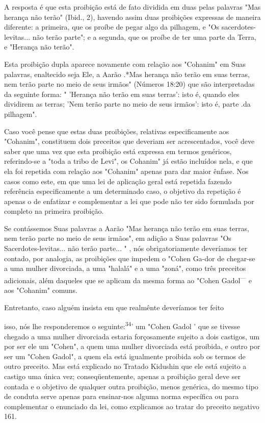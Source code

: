 \begin{itemize}
\begin{enumrate}
\begin{itemize}
\begin{itemize}
\begin{itemize}
A resposta é que esta proibição está de fato dividida em duas pelas
palavras "Mas herança não terão" (Ibid., 2), havendo assim duas
proibições ex­pressas de maneira diferente: a primeira, que os proíbe de
pegar algo da pilha­gem, e "Os sacerdotes-levitas... não terão parte"; e
a segunda, que os proíbe de ter uma parte da Terra, e "Herança não
terão".

Esta proibição dupla aparece novamente com relação aos "Cohanim" em Suas
palavras, enaltecido seja Ele, a Aarão .*Mas herança
não terão em suas terras, nem terão parte no meio de seus irmãos"
(Números 18:20) que são in­terpretadas da seguinte forma: " 'Herança não
terão em suas terras': isto é, quan­do eles dividirem as terras; 'Nem
terão parte no meio de seus irmãos': isto é, parte .da pilhagem".

Caso você pense que estas duas proibições, relativas especificamen­te
aos "Cohanim", constituem dois preceitos que deveriam ser acrescentados,
você deve saber que uma vez que esta proibição está expressa em termos
gené­ricos, referindo-se a "toda a tribo de Levi", os Cohanim" já estão
incluídos nela, e que ela foi repetida com relação aos "Cohanim" apenas
para dar maior ênfase. Nos casos como este, em que uma lei de aplicação
geral está repetida fazendo referência especificamente a um determinado
caso, o objetivo da re­petição é apenas o de enfatizar e complementar a
lei que pode não ter sido for­mulada por completo na primeira proibição.

Se contássemos Suas palavras a Aarão "Mas herança não terão em suas
terras, nem terão parte no meio de seus irmãos", em adição a Suas
pala­vras "Os Sacerdotes-levitas... não terão parte... " , nós
obrigatoriamente deve­ríamos ter contado, por analogia, as proibições
que impedem o "Cohen Ga-dor de chegar-se a uma mulher divorciada, a uma
"halalá" e a uma "zoná", como três preceitos adicionais, além daqueles
que se aplicam da mesma forma ao "Cohen Gadol\textsuperscript{---} e aos
"Cohanim" comuns.


Entretanto, caso alguém insista em que realmênte deveríamos ter feito



isso, nós lhe responderemos o seguinte:\textsuperscript{34}' um "Cohen
Gadol ' que se tivesse chegado a uma mulher divorciada estaria
forçosamente sujeito a dois castigos, um por ser ele um "Cohen", a quem
uma mulher divorciada está proibida, e outro por ser um "Cohen Gadol", a
quem ela está igualmente proibida sob os termos de outro preceito. Mas
está explicado no Tratado Kidushin que ele está sujeito a castigo uma
única vez; conseqüentemente, apenas a proibição geral deve ser contada e
o objetivo de qualquer outra proibição, menos genérica, do mesmo tipo de
conduta serve apenas para ensinar-nos alguma norma espe­cífica ou para
complementar o enunciado da lei, como explicamos ao tratar do preceito
negativo 161.


\end{itemize}
\end{itemize}
\end{itemize}
\end{enumrate}
\end{itemize}

